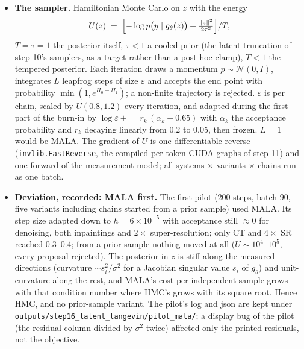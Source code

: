 \documentclass[11pt]{article}
\begin{document}
\begin{itemize}
        it's coming out blurry --- it's averaging all possible things''.
        The experiment shows what the samples look like, and what their
        running mean looks like next to them.
  \item \textbf{The sampler.} Hamiltonian Monte Carlo on $z$ with the
        energy
        \[
          U(z) \;=\; \Bigl[-\log p\bigl(y \mid g_\theta(z)\bigr) + \tfrac{\|z\|^2}{2\tau^2}\Bigr] / T,
        \]
        $T = \tau = 1$ the posterior itself, $\tau < 1$ a cooled prior
        (the latent truncation of step 10's samplers, as a target rather
        than a post-hoc clamp), $T < 1$ the tempered posterior. Each
        iteration draws a momentum $p \sim \mathcal{N}(0, I)$, integrates
        $L$ leapfrog steps of size $\varepsilon$ and accepts the end point
        with probability $\min(1, e^{H_0 - H_1})$; a non-finite trajectory
        is rejected. $\varepsilon$ is per chain, scaled by
        $U(0.8, 1.2)$ every iteration, and adapted during the first part of
        the burn-in by $\log\varepsilon \mathrel{+}= r_k\,(\alpha_k - 0.65)$
        with $\alpha_k$ the acceptance probability and $r_k$ decaying
        linearly from 0.2 to 0.05, then frozen. $L = 1$ would be MALA. The
        gradient of $U$ is one differentiable reverse
        (\texttt{invlib.FastReverse}, the compiled per-token CUDA graphs of
        step 11) and one forward of the measurement model; all systems
        $\times$ variants $\times$ chains run as one batch.
  \item \textbf{Deviation, recorded: MALA first.} The first pilot (200
        steps, batch 90, five variants including chains started from a
        prior sample) used MALA. Its step size adapted down to $h = 6
        \times 10^{-5}$ with acceptance still $\approx 0$ for denoising,
        both inpaintings and $2\times$ super-resolution; only CT and
        $4\times$ SR reached 0.3--0.4; from a prior sample nothing moved at
        all ($U \sim 10^4$--$10^5$, every proposal rejected). The posterior
        in $z$ is stiff along the measured directions (curvature $\sim
        s_i^2/\sigma^2$ for a Jacobian singular value $s_i$ of $g_\theta$)
        and unit-curvature along the rest, and MALA's cost per independent
        sample grows with that condition number where HMC's grows with its
        square root. Hence HMC, and no prior-sample variant. The pilot's
        log and json are kept under
        \texttt{outputs/step16\_latent\_langevin/pilot\_mala/}; a display
        bug of the pilot (the residual column divided by $\sigma^2$ twice)
        affected only the printed residuals, not the objective.

\end{itemize}
\end{document}
